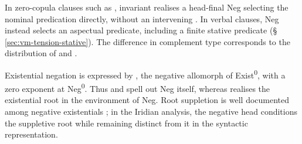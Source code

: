 In zero-copula clauses such as  , invariant  realises a head-final Neg selecting the nominal
predication directly, without an intervening . In verbal
clauses, Neg instead selects an aspectual predicate, including a finite
stative predicate (§\,\ref{sec:vm-tension-stative}). The difference in
complement type corresponds to the distribution of  and
.

Existential negation is expressed by , the negative allomorph of
Exist\textsuperscript{0}, with a zero exponent at Neg\textsuperscript{0}.
Thus  and  spell out Neg itself, whereas 
realises the existential root in the environment of Neg. Root suppletion is
well documented among negative existentials \cite{veselinova2016}; in the
Iridian analysis, the negative head conditions the suppletive root while
remaining distinct from it in the syntactic representation.

